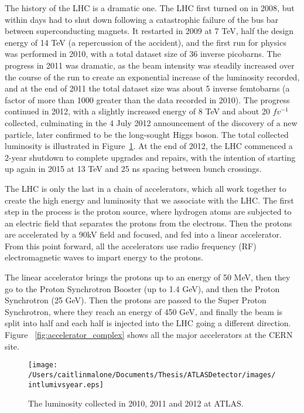 The history of the LHC is a dramatic one.  The LHC first turned on in 2008, but within days had to shut down following a catastrophic failure of the bus bar between superconducting magnets.  It restarted in 2009 at 7 TeV, half the design energy of 14 TeV (a repercussion of the accident), and the first run for physics was performed in 2010, with a total dataset size of 36 inverse picobarns.  The progress in 2011 was dramatic, as the beam intensity was steadily increased over the course of the run to create an exponential increase of the luminosity recorded, and at the end of 2011 the total dataset size was about 5 inverse femtobarns (a factor of more than 1000 greater than the data recorded in 2010).  The progress continued in 2012, with a slightly increased energy of 8 TeV and about 20 $fv^{-1}$ collected, culminating in the 4 July 2012 announcement of the discovery of a new particle, later confirmed to be the long-sought Higgs boson.  The total collected luminosity is illustrated in Figure~\ref{fig:lumi_vs_year}.  At the end of 2012, the LHC commenced a 2-year shutdown to complete upgrades and repairs, with the intention of starting up again in 2015 at 13 TeV and 25 ns spacing between bunch crossings.


The LHC is only the last in a chain of accelerators, which all work together to create the high energy and luminosity that we associate with the LHC.  The first step in the process is the proton source, where hydrogen atoms are subjected to an electric field that separates the protons from the electrons.  Then the protons are accelerated by a 90kV field and focused, and fed into a linear accelerator.  From this point forward, all the accelerators use radio frequency (RF) electromagnetic waves to impart energy to the protons.  

The linear accelerator brings the protons up to an energy of 50 MeV, then they go to the Proton Synchrotron Booster (up to 1.4 GeV), and then the Proton Synchrotron (25 GeV).  Then the protons are passed to the Super Proton Synchrotron, where they reach an energy of 450 GeV, and finally the beam is split into half and each half is injected into the LHC going a different direction.  Figure ~\ref{fig:accelerator_complex} shows all the major accelerators at the CERN site.


\begin{figure}
	\centering
	\texttt{[image: /Users/caitlinmalone/Documents/Thesis/ATLASDetector/images/intlumivsyear.eps]}
	\caption{The luminosity collected in 2010, 2011 and 2012 at ATLAS. \label{fig:lumi_vs_year}}
\end{figure}


